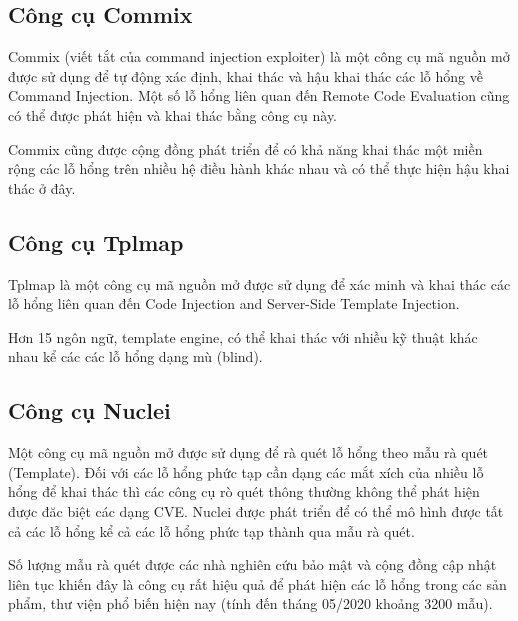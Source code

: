 \documentclass[./../main.tex]{subfiles}
\begin{document}
\subsection{Công cụ Commix}
Commix (viết tắt của command injection exploiter) là một công cụ mã nguồn
mở được sử dụng để tự động xác định, khai thác và hậu khai thác các lỗ
hổng về Command Injection. Một số lỗ hổng liên quan đến
Remote Code Evaluation cũng có thể được phát hiện và khai thác bằng công
cụ này.

Commix cũng được cộng đồng phát triển để có khả năng khai
thác một miền rộng các lỗ hổng trên nhiều hệ điều hành khác nhau
và có thể thực hiện hậu khai thác ở đây.
\subsection{Công cụ Tplmap}
Tplmap là một công cụ mã nguồn mở được sử dụng để xác minh và khai
thác các lỗ hổng liên quan đến Code Injection and Server-Side Template
Injection.


Hơn 15 ngôn ngữ, template engine, có thể khai thác với nhiều kỹ thuật
khác nhau kể các các lỗ hổng dạng mù (blind).

\subsection{Công cụ Nuclei}
Một công cụ mã nguồn mở được sử dụng để rà quét lỗ hổng theo mẫu rà quét (Template).
Đối với các lỗ hổng phức tạp cần dạng các mắt xích của nhiều lỗ hổng để
khai thác thì các công cụ rò quét thông thường không thể phát hiện được đăc biệt
các dạng CVE. Nuclei được phát triển để có thể mô hình được tất cả các lỗ
hổng kể cả các lỗ hổng phức tạp thành qua mẫu rà quét.

Số lượng mẫu rà quét được các nhà nghiên cứu bảo mật và cộng đồng cập nhật liên tục
khiến đây là công cụ rất hiệu quả để phát hiện các lỗ hổng trong các sản phẩm,
thư viện phổ biến hiện nay (tính đến tháng 05/2020 khoảng 3200 mẫu).
\end{document}
